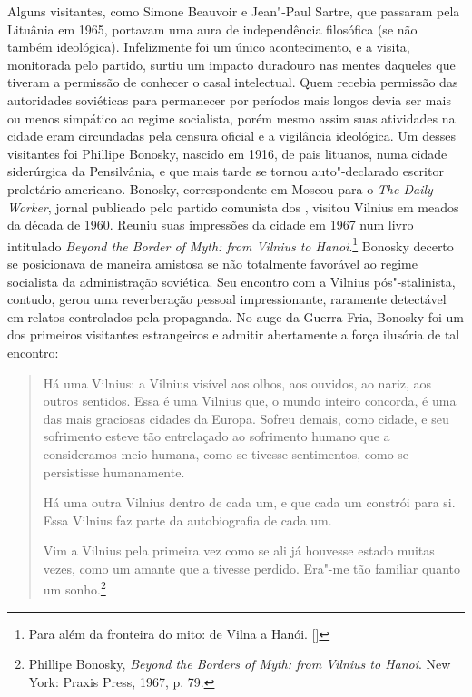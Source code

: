 Alguns visitantes, como Simone Beauvoir e Jean"-Paul Sartre, que passaram
pela Lituânia em 1965, portavam uma aura de independência filosófica (se
não também ideológica). Infelizmente foi um único acontecimento, e a
visita, monitorada pelo partido, surtiu um impacto duradouro nas mentes
daqueles que tiveram a permissão de conhecer o casal intelectual. Quem
recebia permissão das autoridades soviéticas para permanecer por
períodos mais longos devia ser mais ou menos simpático ao regime
socialista, porém mesmo assim suas atividades na cidade eram circundadas
pela censura oficial e a vigilância ideológica. Um desses visitantes foi
Phillipe Bonosky, nascido em 1916, de pais lituanos, numa cidade
siderúrgica da Pensilvânia, e que mais tarde se tornou auto"-declarado
escritor proletário americano. Bonosky, correspondente em Moscou para o
\emph{The Daily Worker}, jornal publicado pelo partido comunista dos
, visitou Vilnius em meados da década de 1960. Reuniu suas impressões
da cidade em 1967 num livro intitulado \emph{Beyond the Border of Myth:
from Vilnius to Hanoi}.\footnote{Para além da fronteira do mito: de
  Vilna a Hanói. []} Bonosky decerto se posicionava de maneira amistosa se
não totalmente favorável ao regime socialista da administração
soviética. Seu encontro com a Vilnius pós"-stalinista, contudo, gerou uma
reverberação pessoal impressionante, raramente detectável em relatos
controlados pela propaganda. No auge da Guerra Fria, Bonosky foi um dos
primeiros visitantes estrangeiros e admitir abertamente a força ilusória
de tal encontro:

\begin{quote}
Há uma Vilnius: a Vilnius visível aos olhos, aos ouvidos, ao nariz, aos
outros sentidos. Essa é uma Vilnius que, o mundo inteiro concorda, é uma
das mais graciosas cidades da Europa. Sofreu demais, como cidade, e seu
sofrimento esteve tão entrelaçado ao sofrimento humano que a
consideramos meio humana, como se tivesse sentimentos, como se
persistisse humanamente.

Há uma outra Vilnius dentro de cada um, e que cada um constrói para si.
Essa Vilnius faz parte da autobiografia de cada um.

Vim a Vilnius pela primeira vez como se ali já houvesse estado muitas
vezes, como um amante que a tivesse perdido. Era"-me tão familiar quanto
um sonho.\footnote{Phillipe Bonosky, \emph{Beyond the Borders of Myth:
  from Vilnius to Hanoi}. New York: Praxis Press, 1967, p. 79.}
\end{quote}

